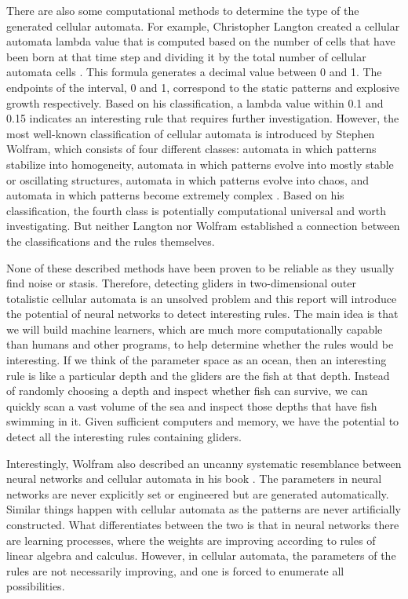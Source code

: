 \documentclass[12pt]{article}
\numberwithin{figure}{section} %
\begin{document}
There are also some computational methods to determine the type of the generated cellular automata. For example, Christopher Langton created a cellular automata lambda value that is computed based on the number of cells that have been born at that time step and dividing it by the total number of cellular automata cells \cite{Edge of Chaos}. This formula generates a decimal value between 0 and 1. The endpoints of the interval, 0 and 1, correspond to the static patterns and explosive growth respectively. Based on his classification, a lambda value within 0.1 and 0.15 indicates an interesting rule that requires further investigation. However, the most well-known classification of cellular automata is introduced by Stephen Wolfram, which consists of four different classes: automata in which patterns stabilize into homogeneity, automata in which patterns evolve into mostly stable or oscillating structures, automata in which patterns evolve into chaos, and automata in which patterns become extremely complex \cite{Cellular automaton}. Based on his classification, the fourth class is potentially computational universal and worth investigating. But neither Langton nor Wolfram established a connection between the classifications and the rules themselves.  

None of these described methods have been proven to be reliable as they usually find noise or stasis. Therefore, detecting gliders in two-dimensional outer totalistic cellular automata is an unsolved problem and this report will introduce the potential of neural networks to detect interesting rules. The main idea is that we will build machine learners, which are much more computationally capable than humans and other programs, to help determine whether the rules would be interesting. If we think of the parameter space as an ocean, then an interesting rule is like a particular depth and the gliders are the fish at that depth. Instead of randomly choosing a depth and inspect whether fish can survive, we can quickly scan a vast volume of the sea and inspect those depths that have fish swimming in it. Given sufficient computers and memory, we have the potential to detect all the interesting rules containing gliders. 

Interestingly, Wolfram also described an uncanny systematic resemblance between neural networks and cellular automata in his book \cite{A new kind of Science}. The parameters in neural networks are never explicitly set or engineered but are generated automatically. Similar things happen with cellular automata as the patterns are never artificially constructed. What differentiates between the two is that in neural networks there are learning processes, where the weights are improving according to rules of linear algebra and calculus. However, in cellular automata, the parameters of the rules are not necessarily improving, and one is forced to enumerate all possibilities.
\end{document}
